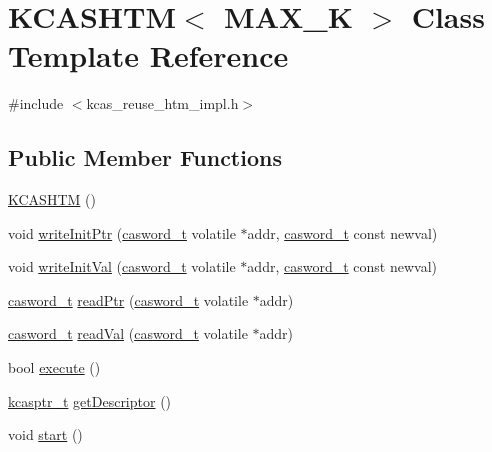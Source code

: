 \hypertarget{classKCASHTM}{}\section{K\+C\+A\+S\+H\+TM$<$ M\+A\+X\+\_\+K $>$ Class Template Reference}
\label{classKCASHTM}


{\ttfamily \#include $<$kcas\+\_\+reuse\+\_\+htm\+\_\+impl.\+h$>$}

\subsection*{Public Member Functions}
\begin{DoxyCompactItemize}
\item 
\hyperlink{classKCASHTM_a5c4a7dc01aa24d18bbf2be197adb4536}{K\+C\+A\+S\+H\+TM} ()
\item 
void \hyperlink{classKCASHTM_a1cc8f307886591c9fe769cb283d14226}{write\+Init\+Ptr} (\hyperlink{rq__unsafe_8h_ad45142aaf2ff20a036dc6242b8483e9c}{casword\+\_\+t} volatile $\ast$addr, \hyperlink{rq__unsafe_8h_ad45142aaf2ff20a036dc6242b8483e9c}{casword\+\_\+t} const newval)
\item 
void \hyperlink{classKCASHTM_ac3dd909b203532fd9d24981a3bd9ba5c}{write\+Init\+Val} (\hyperlink{rq__unsafe_8h_ad45142aaf2ff20a036dc6242b8483e9c}{casword\+\_\+t} volatile $\ast$addr, \hyperlink{rq__unsafe_8h_ad45142aaf2ff20a036dc6242b8483e9c}{casword\+\_\+t} const newval)
\item 
\hyperlink{rq__unsafe_8h_ad45142aaf2ff20a036dc6242b8483e9c}{casword\+\_\+t} \hyperlink{classKCASHTM_aa655018e007f3c1604023541ca24b653}{read\+Ptr} (\hyperlink{rq__unsafe_8h_ad45142aaf2ff20a036dc6242b8483e9c}{casword\+\_\+t} volatile $\ast$addr)
\item 
\hyperlink{rq__unsafe_8h_ad45142aaf2ff20a036dc6242b8483e9c}{casword\+\_\+t} \hyperlink{classKCASHTM_a99b96913aad51e1e7128e8561230ded8}{read\+Val} (\hyperlink{rq__unsafe_8h_ad45142aaf2ff20a036dc6242b8483e9c}{casword\+\_\+t} volatile $\ast$addr)
\item 
bool \hyperlink{classKCASHTM_a3cbdb60b25f482567d6be0d3d545a6ea}{execute} ()
\item 
\hyperlink{kcas__reuse__impl_8h_a5bbc81d391bfd6b4288a0d33f105a0b2}{kcasptr\+\_\+t} \hyperlink{classKCASHTM_a410b6c7f87aed36478dc7adc9c54478f}{get\+Descriptor} ()
\item 
void \hyperlink{classKCASHTM_a8788b509924018d6fc982e5d553b24d8}{start} ()
\item 

\end{DoxyCompactItemize}
